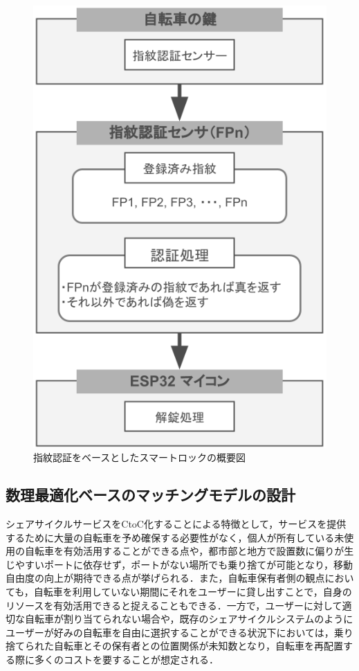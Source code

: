           \begin{figure}[htbp]
            \centering
            \includegraphics[scale=0.46]
            {figures/overallImageOfFingerprintUnlock.png}
            \caption{指紋認証をベースとしたスマートロックの概要図}
            \label{fig:指紋認証をベースとしたスマートロックの概要図}
          \end{figure}
          
  \subsection{数理最適化ベースのマッチングモデルの設計}
    \label{sec:数理最適化ベースのマッチングモデルの設計}
      \par シェアサイクルサービスをCtoC化することによる特徴として，サービスを提供するために大量の自転車を予め確保する必要性がなく，個人が所有している未使用の自転車を有効活用することができる点や，都市部と地方で設置数に偏りが生じやすいポートに依存せず，ポートがない場所でも乗り捨てが可能となり，移動自由度の向上が期待できる点が挙げられる．また，自転車保有者側の観点においても，自転車を利用していない期間にそれをユーザーに貸し出すことで，自身のリソースを有効活用できると捉えることもできる．一方で，ユーザーに対して適切な自転車が割り当てられない場合や，既存のシェアサイクルシステムのようにユーザーが好みの自転車を自由に選択することができる状況下においては，乗り捨てられた自転車とその保有者との位置関係が未知数となり，自転車を再配置する際に多くのコストを要することが想定される．
          
